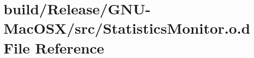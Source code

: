 \hypertarget{_g_n_u-_mac_o_s_x_2src_2_statistics_monitor_8o_8d}{}\section{build/\+Release/\+G\+N\+U-\/\+Mac\+O\+S\+X/src/\+Statistics\+Monitor.o.\+d File Reference}
\label{_g_n_u-_mac_o_s_x_2src_2_statistics_monitor_8o_8d}
